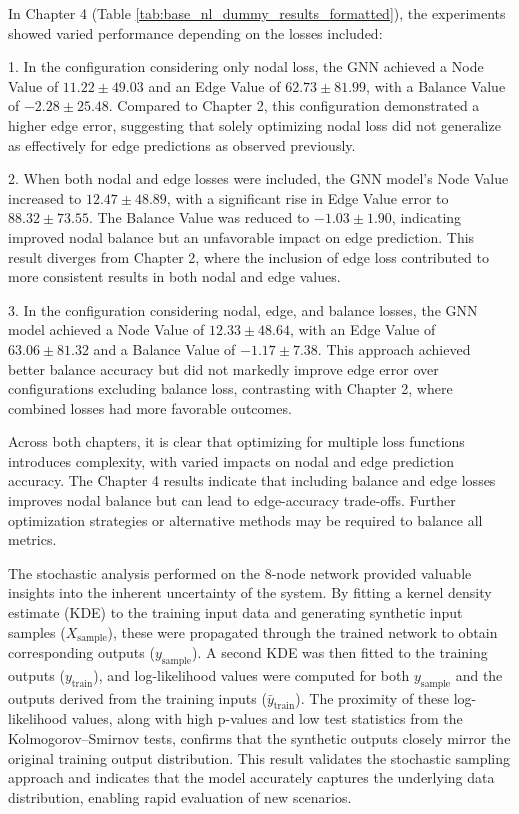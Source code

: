 In Chapter 4 (Table \ref{tab:base_nl_dummy_results_formatted}), the experiments showed varied performance depending on the losses included:

1. In the configuration considering only nodal loss, the GNN achieved a Node Value of \(11.22 \pm 49.03\) and an Edge Value of \(62.73 \pm 81.99\), with a Balance Value of \(-2.28 \pm 25.48\). Compared to Chapter 2, this configuration demonstrated a higher edge error, suggesting that solely optimizing nodal loss did not generalize as effectively for edge predictions as observed previously.

2. When both nodal and edge losses were included, the GNN model’s Node Value increased to \(12.47 \pm 48.89\), with a significant rise in Edge Value error to \(88.32 \pm 73.55\). The Balance Value was reduced to \(-1.03 \pm 1.90\), indicating improved nodal balance but an unfavorable impact on edge prediction. This result diverges from Chapter 2, where the inclusion of edge loss contributed to more consistent results in both nodal and edge values.

3. In the configuration considering nodal, edge, and balance losses, the GNN model achieved a Node Value of \(12.33 \pm 48.64\), with an Edge Value of \(63.06 \pm 81.32\) and a Balance Value of \(-1.17 \pm 7.38\). This approach achieved better balance accuracy but did not markedly improve edge error over configurations excluding balance loss, contrasting with Chapter 2, where combined losses had more favorable outcomes.

Across both chapters, it is clear that optimizing for multiple loss functions introduces complexity, with varied impacts on nodal and edge prediction accuracy. The Chapter 4 results indicate that including balance and edge losses improves nodal balance but can lead to edge-accuracy trade-offs. Further optimization strategies or alternative methods may be required to balance all metrics.


The stochastic analysis performed on the 8-node network provided valuable insights into the inherent uncertainty of the system. By fitting a kernel density estimate (KDE) to the training input data and generating synthetic input samples (\(X_{\text{sample}}\)), these were propagated through the trained network to obtain corresponding outputs (\(y_{\text{sample}}\)). A second KDE was then fitted to the training outputs (\(y_{\text{train}}\)), and log-likelihood values were computed for both \(y_{\text{sample}}\) and the outputs derived from the training inputs (\(\bar{y}_{\text{train}}\)). The proximity of these log-likelihood values, along with high p-values and low test statistics from the Kolmogorov–Smirnov tests, confirms that the synthetic outputs closely mirror the original training output distribution. This result validates the stochastic sampling approach and indicates that the model accurately captures the underlying data distribution, enabling rapid evaluation of new scenarios.

